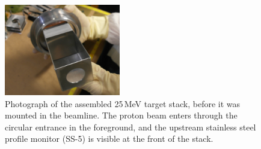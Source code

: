 \begin{figure}
 \centering
 \includegraphics[width=0.45\textwidth]{./figures/SAM_2494.JPG}
 \caption{\label{fig:fe_target_stack}Photograph of the assembled 25\,MeV target stack, before it was mounted in the beamline. The proton beam enters through the circular entrance in the foreground, and the upstream stainless steel profile monitor (SS-5) is visible at the front of the stack.}
\end{figure}

